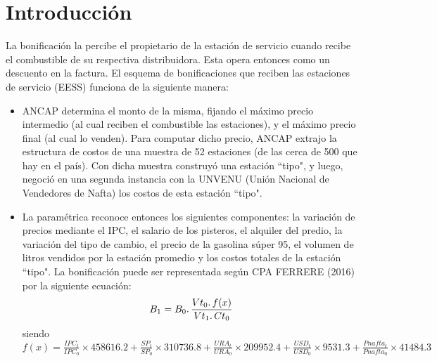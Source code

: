 \documentclass[spanish,A4,11pt]{article}
\begin{document}
\section{Introducción}
La bonificación la percibe el propietario de la estación de servicio cuando recibe el combustible de su respectiva distribuidora. Esta opera entonces como un descuento en la factura. El esquema de bonificaciones que reciben las estaciones de servicio (EESS) funciona de la siguiente manera:
\begin{itemize}
\item ANCAP determina el monto de la misma, fijando el máximo precio intermedio (al cual reciben el combustible las estaciones), y el máximo precio final (al cual lo venden). Para computar dicho precio, ANCAP extrajo la estructura de costos de una muestra de 52 estaciones (de las cerca de 500 que hay en el país). Con dicha muestra construyó una estación ``tipo", y luego, negoció en una segunda instancia con la UNVENU (Unión Nacional de Vendedores de Nafta) los costos de esta estación ``tipo".
\item La paramétrica reconoce entonces los siguientes componentes: la variación de precios mediante el IPC, el salario de los pisteros, el alquiler del predio, la variación del tipo de cambio, el precio de la gasolina súper 95, el volumen de litros vendidos por la estación promedio y los costos totales de la estación ``tipo". La bonificación puede ser representada según CPA FERRERE (2016) por la siguiente ecuación:
$$ B_1=B_0\ldotp \frac{Vt_0\ldotp f(x)}{Vt_1 \ldotp Ct_0} $$
siendo $f(x) = \frac{IPC_t}{IPC_0}\times 458616.2 + \frac{SP_t}{SP_0}\times310736.8 + \frac{URA_t}{URA_0}\times 209952.4 + \frac{USD_t}{USD_0}\times 9531.3 + \frac{Pnafta_t}{Pnafta_0}\times 41484.3$ 


\end{itemize}
\end{document}
